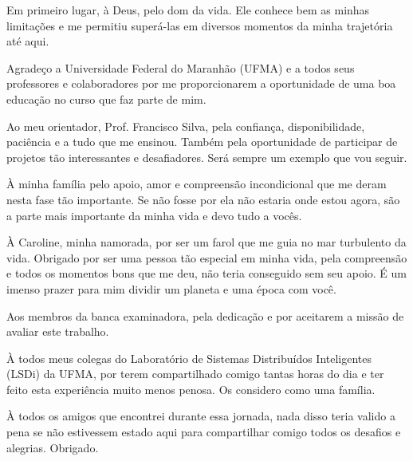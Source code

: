 \begin{agradecimentos}
Em primeiro lugar, à Deus, pelo dom da vida.
Ele conhece bem as minhas limitações e me permitiu superá-las em diversos momentos da minha trajetória até aqui.

Agradeço a Universidade Federal do Maranhão (UFMA) e a todos seus professores e colaboradores por me proporcionarem a oportunidade de uma boa educação no curso que faz parte de mim.

Ao meu orientador, Prof. Francisco Silva, pela confiança, disponibilidade, paciência e a tudo que me ensinou.
Também pela oportunidade de participar de projetos tão interessantes e desafiadores.
Será sempre um exemplo que vou seguir.


À minha família pelo apoio, amor e compreensão incondicional que me deram nesta fase tão importante.
Se não fosse por ela não estaria onde estou agora, são a parte mais importante da minha vida e devo tudo a vocês.

À Caroline, minha namorada, por ser um farol que me guia no mar turbulento da vida.
Obrigado por ser uma pessoa tão especial em minha vida, pela compreensão e todos os momentos bons que me deu, não teria conseguido sem seu apoio.
É um imenso prazer para mim dividir um planeta e uma época com você.

Aos membros da banca examinadora, pela dedicação e por aceitarem a missão de avaliar este trabalho.

À todos meus colegas do Laboratório de Sistemas Distribuídos Inteligentes (LSDi) da UFMA, por terem compartilhado comigo tantas horas do dia e ter feito esta experiência muito menos penosa.
Os considero como uma família.

À todos os amigos que encontrei durante essa jornada, nada disso teria valido a pena se não estivessem estado aqui para compartilhar comigo todos os desafios e alegrias.
Obrigado.


\end{agradecimentos}

